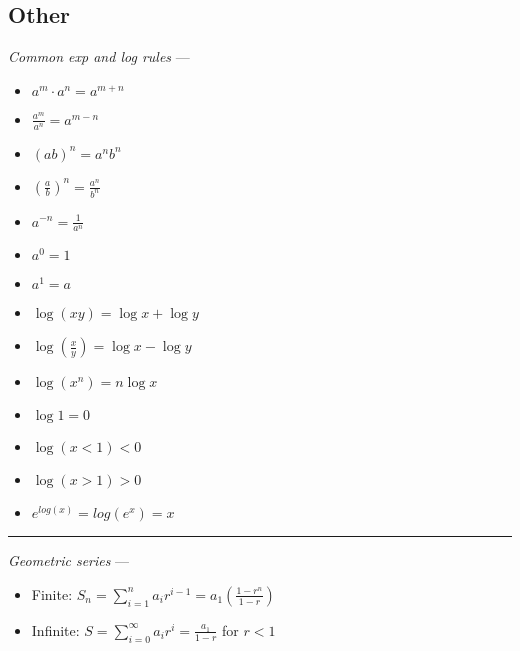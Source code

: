 \subsection*{Other}
\emph{Common exp and log rules} ---
\begin{multicols}{2}
\begin{itemize}
    \item $a^m \cdot a^n = a^{m+n}$
    \item $\frac{a^m}{a^n} = a^{m-n}$
    \item $(ab)^n = a^n b^n$
    \item $\left(\frac{a}{b}\right)^n = \frac{a^n}{b^n}$
    \item $a^{-n} = \frac{1}{a^n}$
    \item $a^0 = 1$
    \item $a^1 = a$
    \item $\log(xy) = \log x + \log y$
    \item $\log\left(\frac{x}{y}\right) = \log x - \log y$
    \item $\log(x^n) = n \log x$
    \item $\log 1 = 0$
    \item $\log (x<1) < 0$
    \item $\log (x>1) > 0$
    \item $e^{log(x)} = log(e^x) = x$
\end{itemize}
\end{multicols}

{\color{lightgray}\hrule height 0.001mm}
\emph{Geometric series} --- 
\begin{itemize}
    \item Finite: $S_n = \sum_{i=1}^n a_i r^{i-1} = a_1 (\frac{1-r^n}{1-r})$
    \item Infinite: $S = \sum_{i=0}^\infty a_i r^i = \frac{a_1}{1-r}$ for $r < 1$
\end{itemize}